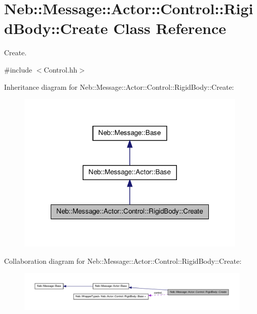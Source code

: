 \hypertarget{classNeb_1_1Message_1_1Actor_1_1Control_1_1RigidBody_1_1Create}{\section{\-Neb\-:\-:\-Message\-:\-:\-Actor\-:\-:\-Control\-:\-:\-Rigid\-Body\-:\-:\-Create \-Class \-Reference}
\label{classNeb_1_1Message_1_1Actor_1_1Control_1_1RigidBody_1_1Create}
}


\-Create.  




{\ttfamily \#include $<$\-Control.\-hh$>$}



\-Inheritance diagram for \-Neb\-:\-:\-Message\-:\-:\-Actor\-:\-:\-Control\-:\-:\-Rigid\-Body\-:\-:\-Create\-:\nopagebreak
\begin{figure}[H]
\begin{center}
\leavevmode
\includegraphics[width=312pt]{classNeb_1_1Message_1_1Actor_1_1Control_1_1RigidBody_1_1Create__inherit__graph}
\end{center}
\end{figure}


\-Collaboration diagram for \-Neb\-:\-:\-Message\-:\-:\-Actor\-:\-:\-Control\-:\-:\-Rigid\-Body\-:\-:\-Create\-:\nopagebreak
\begin{figure}[H]
\begin{center}
\leavevmode
\includegraphics[width=350pt]{classNeb_1_1Message_1_1Actor_1_1Control_1_1RigidBody_1_1Create__coll__graph}
\end{center}
\end{figure}
